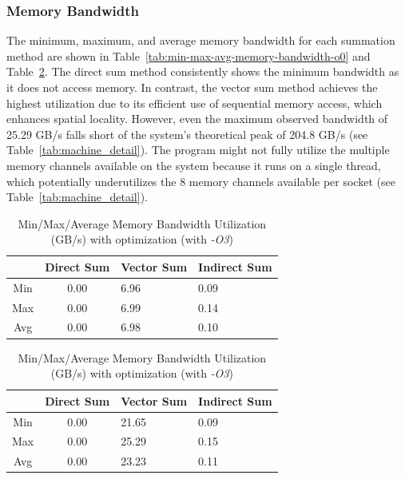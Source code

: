 \subsubsection{Memory Bandwidth}
The minimum, maximum, and average memory bandwidth for each summation method are shown in Table~\ref{tab:min-max-avg-memory-bandwidth-o0} and Table~\ref{tab:min-max-avg-memory-bandwidth-o3}. The direct sum method consistently shows the minimum bandwidth as it does not access memory. In contrast, the vector sum method achieves the highest utilization due to its efficient use of sequential memory access, which enhances spatial locality. However, even the maximum observed bandwidth of 25.29 GB/s falls short of the system's theoretical peak of 204.8 GB/s (see Table~\ref{tab:machine_detail}). The program might not fully utilize the multiple memory channels available on the system because it runs on a single thread, which potentially underutilizes the 8 memory channels available per socket (see Table~\ref{tab:machine_detail}).

\begin{table}[htbp]
    \centering
    \begin{tabular}{c|cll}
 & Direct Sum & Vector Sum & Indirect Sum \\ \hline
 Min& 0.00& 6.96&0.09\\
 Max& 0.00& 6.99&0.14\\
 Avg& 0.00& 6.98&0.10\\ 
    \end{tabular}
    \caption{Min/Max/Average Memory Bandwidth Utilization (GB/s) without optimization (with \textit{-O0})}
    \label{tab:min-max-avg-memory-bandwidth-o0}
    \begin{tabular}{c|cll}
 & Direct Sum & Vector Sum & Indirect Sum \\ \hline
 Min& 0.00& 21.65&0.09\\
 Max& 0.00& 25.29&0.15\\
 Avg& 0.00& 23.23&0.11\\ 
    \end{tabular}
    \caption{Min/Max/Average  Memory Bandwidth Utilization (GB/s) with optimization (with \textit{-O3})}
    \label{tab:min-max-avg-memory-bandwidth-o3}
\end{table}


